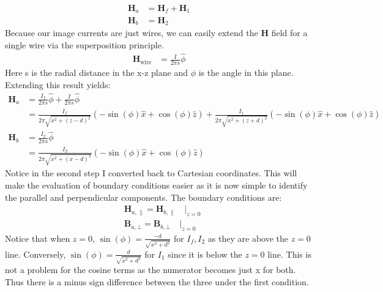 \documentclass[a4paper, 11pt]{article}
\begin{document}
	\begin{align*}
		\mathbf{H}_a &= \mathbf{H}_f + \mathbf{H}_1 \\ 
		\mathbf{H}_b &= \mathbf{H}_2 
	\end{align*}
Because our image currents are just wires, we can easily extend the \textbf{H} field for a single wire via the superposition principle. 
	\begin{align*}
		\mathbf{H}_{\text{wire}} &= \frac{I}{2\pi s}\hat{\phi}
	\end{align*}
Here s is the radial distance in the x-z plane and $\phi$ is the angle in this plane. Extending this result yields: 
	\begin{align}
		\mathbf{H}_a 	&= \frac{I_f}{2\pi s}\hat{\phi} + \frac{I}{2\pi s}\hat{\phi} \\
						&= \frac{I_f}{2\pi\sqrt{x^2+(z-d)^2}}(-\sin(\phi)\hat{x} +\cos(\phi)\hat{z})+ \frac{I_1}{2\pi\sqrt{x^2+(z+d)^2}}(-\sin(\phi)\hat{x} +\cos(\phi)\hat{z})\\
		\mathbf{H}_b	&= \frac{I_2}{2\pi s}\hat{\phi} \\ 
						&=\frac{I_2}{2\pi\sqrt{x^2+(x-d)^2}}(-\sin(\phi)\hat{x} +\cos(\phi)\hat{z})
	\end{align}
Notice in the second step I converted back to Cartesian coordinates. This will make the evaluation of boundary conditions easier as it is now simple to identify the parallel and perpendicular components. The boundary conditions are: 	
	\begin{align*}
		&\mathbf{H}_{a,\parallel} = \mathbf{H}_{b,\parallel} \quad \Big|_{z=0} \\ 
		&\mathbf{B}_{a,\bot} = \mathbf{B}_{b, \bot} \quad \Big|_{z=0}
	\end{align*}
Notice that when $z=0$, $\sin(\phi) = \frac{-d}{\sqrt{x^2+d^2}}$ for $I_f, I_2$ as they are above the $z=0$ line. Conversely, $\sin(\phi) = \frac{d}{\sqrt{x^2+d^2}}$ for $I_1$ since it is below the $z=0$ line. This is not a problem for the cosine terms as the numerator becomes just x for both.  Thus there is a minus sign difference between the three under the first condition. \\ 
\end{document}
